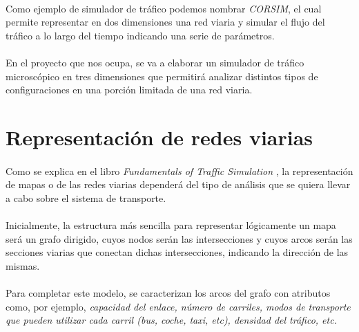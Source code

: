 	
	\paragraph{}
	Como ejemplo de simulador de tráfico podemos nombrar \emph{CORSIM}, el cual permite representar en dos dimensiones una red viaria y simular el flujo del tráfico a lo largo del tiempo indicando una serie de parámetros.
	
	
	\paragraph{}
	En el proyecto que nos ocupa, se va a elaborar un simulador de tráfico microscópico en tres dimensiones que permitirá analizar distintos tipos de configuraciones en una porción limitada de una red viaria.

\newpage

\section{Representación de redes viarias}

	\paragraph{}
	Como se explica en el libro \emph{Fundamentals of Traffic Simulation} \cite{Barcelo2010}, la representación de mapas o de las redes viarias dependerá del tipo de análisis que se quiera llevar a cabo sobre el sistema de transporte.
	
	\paragraph{}
	Inicialmente, la estructura más sencilla para representar lógicamente un mapa será un grafo dirigido, cuyos nodos serán las intersecciones y cuyos arcos serán las secciones viarias que conectan dichas intersecciones, indicando la dirección de las mismas.
	
	\paragraph{}
	Para completar este modelo, se caracterizan los arcos del grafo con atributos como, por ejemplo,  \emph{capacidad del enlace, número de carriles, modos de transporte que pueden utilizar cada carril (bus, coche, taxi, etc), densidad del tráfico, etc.}
	
